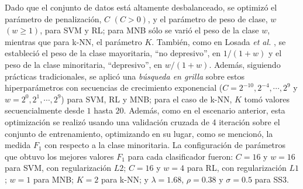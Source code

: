 Dado que el conjunto de datos está altamente desbalanceado, se optimizó el parámetro de penalización, $C$ $(C> 0)$, y el parámetro de peso de clase, $w$ $(w\geq 1)$, para \ac{SVM} y \ac{RL}; para \ac{MNB} sólo se varió el peso de la clase $w$, mientras que para \ac{k-NN}, el parámetro $K$.
También, como en Losada \emph{et al.} \cite{losada2016test}, se estableció el peso de la clase mayoritaria, ``no depresivo'', en $1/(1 + w)$ y el peso de la clase minoritaria, ``depresivo'', en $w/(1 + w) $. Además, siguiendo prácticas tradicionales, se aplicó una \emph{búsqueda en grilla} sobre estos hiperparámetros con secuencias de crecimiento exponencial ($C = 2^{-10}, 2^{-4}, \cdots, 2^9$ y $w = 2^0, 2^1, \cdots, 2^9 $) para \ac{SVM}, \ac{RL} y \ac{MNB}; para el caso de \ac{k-NN}, $K$ tomó valores secuencialmente desde $1$ hasta $20$.
Además, como en el escenario anterior, esta optimización se realizó usando una validación cruzada de 4 iteración sobre el conjunto de entrenamiento, optimizando en su lugar, como se mencionó, la medida $F_1$ con respecto a la clase minoritaria. La configuración de parámetros que obtuvo los mejores valores $F_1$ para cada clasificador fueron: $C = 16$ y $w = 16$ para \ac{SVM}, con regularización $L2$; $C = 16$ y $w = 4$ para \ac{RL}, con regularización $L1$; $w = 1$ para \ac{MNB}; $K = 2$ para \ac{k-NN}; y $\lambda = 1.68$, $\rho = 0.38$ y $\sigma = 0.5$ para SS3.

